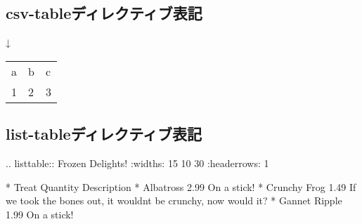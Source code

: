 \documentclass[letterpaper,10pt,dvipdfmx,openany,oneside]{sphinxmanual}
\begin{document}
\subsection{csv-tableディレクティブ表記}
\label{\detokenize{1.chapter/basic_syntax:csv-table}}
%
\begin{sphinxVerbatim}[commandchars=\\\{\}]
 
      
    

\end{sphinxVerbatim}

↓


\begin{savenotes}\sphinxattablestart
\raggedright
\begin{tabulary}{\linewidth}[t]{|T|T|T|}
\hline
{}\relax &\relax &\relax \\
\hline
a
&
b
&
c
\\
&
2
&
3
\\
\hline
\end{tabulary}
\par
\sphinxattableend\end{savenotes}


\subsection{list-tableディレクティブ表記}
\label{\detokenize{1.chapter/basic_syntax:list-table}}
%
\begin{sphinxVerbatim}[commandchars=\\\{\}]
.. list\PYGZhy{}table:: Frozen Delights!
   :widths: 15 10 30
   :header\PYGZhy{}rows: 1

   * \PYGZhy{} Treat
   \PYGZhy{} Quantity
   \PYGZhy{} Description
   * \PYGZhy{} Albatross
   \PYGZhy{} 2.99
   \PYGZhy{} On a stick!
   * \PYGZhy{} Crunchy Frog
   \PYGZhy{} 1.49
   \PYGZhy{} If we took the bones out, it wouldn\PYGZsq{}t be
      crunchy, now would it?
   * \PYGZhy{} Gannet Ripple
   \PYGZhy{} 1.99
   \PYGZhy{} On a stick!
\end{sphinxVerbatim}
\end{document}

